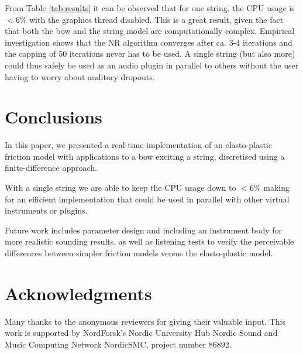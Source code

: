 \documentclass[twoside,a4paper,dvipsnames]{article}
\begin{document}
From Table \ref{tab:results} it can be observed that for one string, the CPU usage is $<6\%$ with the graphics thread disabled. This is a great result, given the fact that both the bow and the string model are computationally complex. Empirical investigation shows that the NR algorithm converges after ca. 3-4 iterations and the capping of 50 iterations never has to be used. A single string (but also more) could thus safely be used as an audio plugin in parallel to others without the user having to worry about auditory dropouts. %

\section{Conclusions}\label{sec:conclusion}
In this paper, we presented a real-time implementation of an elasto-plastic friction model with applications to a  bow exciting a string, discretised using a finite-difference approach. 

With a single string we are able to keep the CPU usage down to $<6\%$ making for an efficient implementation that could be used in parallel with other virtual instruments or plugins.

Future work includes parameter design and including an instrument body for more realistic sounding results, as well as listening tests to verify the perceivable differences between simpler friction models versus the elasto-plastic model.



\section{Acknowledgments}
Many thanks to the anonymous reviewers for giving their valuable input. This work is supported by NordForsk's Nordic
University Hub Nordic Sound and Music Computing Network
NordicSMC, project number 86892.

\begin{footnotesize}

 
\end{footnotesize}

\end{document}
